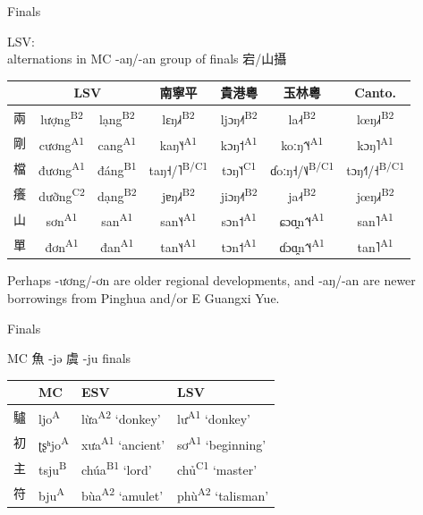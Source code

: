 \documentclass{beamer}
\begin{document}
\begin{frame}[fragile]{Finals}

LSV:\\ 
alternations in MC -aŋ/-an group of finals 宕/山攝\\ 

\bigskip
{\small
\begin{tabular}{l|c c| c c c c}
 & \multicolumn{2}{c|}{LSV} & 南寧平 & 貴港粵 & 玉林粵 & Canto.\\ \hline
兩 & lượng\textsuperscript{B2} & lạng\textsuperscript{B2} & lɛŋ˩˧\textsuperscript{B2} & ljɔŋ˨˦\textsuperscript{B2} & la˨˧\textsuperscript{B2} & lœŋ˩˧\textsuperscript{B2}\\
剛 & cương\textsuperscript{A1} & cang\textsuperscript{A1} & kaŋ˥˧\textsuperscript{A1} & kɔŋ˦\textsuperscript{A1} & koːŋ˦˥˧\textsuperscript{A1} & kɔŋ˥\textsuperscript{A1}\\
檔 & đương\textsuperscript{A1} & đáng\textsuperscript{B1} & taŋ˧/˥\textsuperscript{B/C1} & tɔŋ˥˦\textsuperscript{C1} & ɗoːŋ˧/˦˩\textsuperscript{B/C1} & tɔŋ˧˥/˧\textsuperscript{B/C1}\\
癢 & dưỡng\textsuperscript{C2} & dạng\textsuperscript{B2} & jɐŋ˩˧\textsuperscript{B2} & jiɔŋ˨˦\textsuperscript{B2} & ja˨˧\textsuperscript{B2} & jœŋ˩˧\textsuperscript{B2}\\ \hline
山 & sơn\textsuperscript{A1} & san\textsuperscript{A1} & san˥˧\textsuperscript{A1} & sɔn˦\textsuperscript{A1} & ɕɔɑ̯n˦˥˧\textsuperscript{A1} & san˥\textsuperscript{A1}\\
單 & đơn\textsuperscript{A1} & đan\textsuperscript{A1} & tan˥˧\textsuperscript{A1} & tɔn˦\textsuperscript{A1} & ɗɔɑ̯n˦˥˧\textsuperscript{A1} & tan˥\textsuperscript{A1}\\
\end{tabular}}

\bigskip
Perhaps -ương/-ơn are older regional developments, and -aŋ/-an are newer borrowings from Pinghua and/or E Guangxi Yue.

\end{frame}

\begin{frame}[fragile]{Finals}

MC 魚 -jǝ 虞 -ju finals

\bigskip
\begin{tabular}{l|l|l l}
 & MC & ESV & LSV\\ \hline
驢 & ljo\textsuperscript{A} & lừa\textsuperscript{A2} \enquote*{donkey} & lư\textsuperscript{A1} \enquote*{donkey}\\
初 & ʈʂʰjo\textsuperscript{A} & xưa\textsuperscript{A1} \enquote*{ancient} & sơ\textsuperscript{A1} \enquote*{beginning}\\ \hline
主 & tsju\textsuperscript{B} & chúa\textsuperscript{B1} \enquote*{lord} & chủ\textsuperscript{C1} \enquote*{master}\\
符 & bju\textsuperscript{A} & bùa\textsuperscript{A2} \enquote*{amulet} & phù\textsuperscript{A2} \enquote*{talisman}\\

\end{tabular}

\end{frame}
\end{document}
